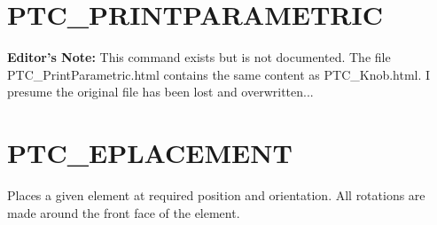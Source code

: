  
% 
% 


\section{PTC\_PRINTPARAMETRIC}
\label{sec:ptc_printparametric}

{\bf Editor's Note:} This command exists but is not documented. The file 
PTC\_PrintParametric.html contains the same content as PTC\_Knob.html. I
presume the original file has been lost and overwritten...


\section{PTC\_EPLACEMENT}
\label{sec:ptc_eplacement}

Places a given element at required position and orientation.  All
rotations are made around the front face of the element.



